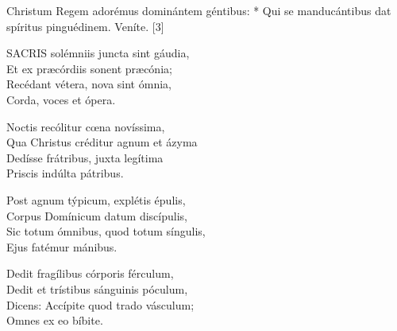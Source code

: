 
 Christum Regem adorémus dominántem géntibus: * Qui se manducántibus dat spíritus pinguédinem.  Veníte. [3]


\lettrine[lines=2]{S}{ACRIS} solémniis juncta sint gáudia,\\
Et ex præcórdiis sonent præcónia;\\
Recédant vétera, nova sint ómnia,\\
Corda, voces et ópera.

Noctis recólitur cœna novíssima,\\
Qua Christus créditur agnum et ázyma\\
Dedísse frátribus, juxta legítima\\
Priscis indúlta pátribus.

Post agnum týpicum, explétis épulis,\\
Corpus Domínicum datum discípulis,\\
Sic totum ómnibus, quod totum síngulis,\\
Ejus fatémur mánibus.

Dedit fragílibus córporis férculum,\\
Dedit et trístibus sánguinis póculum,\\
Dicens: Accípite quod trado vásculum;\\
Omnes ex eo bíbite.


